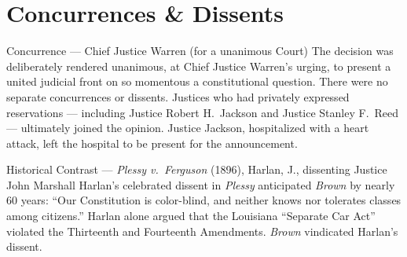 \section{Concurrences \& Dissents}

\begin{rvcomment}{Concurrence --- Chief Justice Warren (for a unanimous Court)}
  The decision was deliberately rendered unanimous, at Chief Justice Warren's urging,
  to present a united judicial front on so momentous a constitutional question.  There
  were no separate concurrences or dissents.  Justices who had privately expressed
  reservations --- including Justice Robert H.\ Jackson and Justice Stanley F.\ Reed ---
  ultimately joined the opinion.  Justice Jackson, hospitalized with a heart attack,
  left the hospital to be present for the announcement.
\end{rvcomment}

\begin{rvcomment}{Historical Contrast --- \textit{Plessy v.\ Ferguson} (1896), Harlan, J., dissenting}
  Justice John Marshall Harlan's celebrated dissent in \textit{Plessy} anticipated
  \textit{Brown} by nearly 60 years: ``Our Constitution is color-blind, and neither
  knows nor tolerates classes among citizens.''  Harlan alone argued that the Louisiana
  ``Separate Car Act'' violated the Thirteenth and Fourteenth Amendments.
  \textit{Brown} vindicated Harlan's dissent.
\end{rvcomment}

